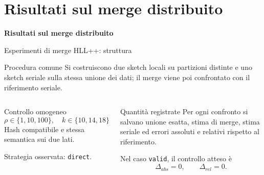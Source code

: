 \documentclass[aspectratio=169,11pt]{beamer}
\begin{document}
\section{Risultati sul merge distribuito}

\begin{frame}[plain]
  \centering
  \vfill
  {\LARGE\bfseries Risultati sul merge distribuito}
  \vfill
\end{frame}

\begin{frame}{Esperimenti di merge HLL++: struttura}
  \begin{block}{Procedura comune}
    \small
    Si costruiscono due sketch locali su partizioni distinte e uno sketch
    seriale sulla stessa unione dei dati; il merge viene poi confrontato con il
    riferimento seriale.
  \end{block}

  \vspace{0.15cm}

  \begin{columns}[T,onlytextwidth]
      \begin{block}{Controllo omogeneo}
        \footnotesize
        \[
          \rho \in \{1,10,100\}, \quad
          k \in \{10,14,18\}
        \]
        Hash compatibile e stessa semantica sui due lati.

        Strategia osservata: \texttt{direct}.
      \end{block}
      \begin{block}{Quantit\`a registrate}
        \footnotesize
        Per ogni confronto si salvano unione esatta, stima di merge, stima
        seriale ed errori assoluti e relativi rispetto al riferimento.

        Nel caso \texttt{valid}, il controllo atteso \`e
        \[
          \Delta_{abs}=0, \qquad \Delta_{rel}=0.
        \]
      \end{block}
  \end{columns}
\end{frame}
\end{document}
